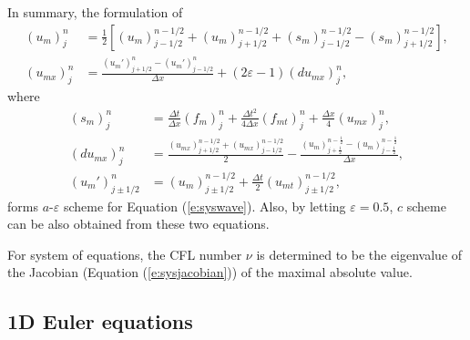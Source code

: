 \documentclass[11pt,dvips]{article}
\numberwithin{equation}{section}
\begin{document}
In summary, the formulation of
\begin{align}
  (u_m)_j^n &= \frac{1}{2}\left[
      (u_m)_{j-1/2}^{n-1/2} + (u_m)_{j+1/2}^{n-1/2}
    + (s_m)_{j-1/2}^{n-1/2} - (s_m)_{j+1/2}^{n-1/2}
    \right], \label{e:sysaeu} \\
  (u_{mx})_j^n &= \frac{(u_m')_{j+1/2}^n-(u_m')_{j-1/2}^n}{\Delta x}
    + (2\varepsilon-1)(du_{mx})_j^n, \label{e:sysaeux}
\end{align}
where
\begin{align*}
  (s_m)_j^n &=
      \frac{\Delta t}  {\Delta x} (f_m)_j^n
    + \frac{\Delta t^2}{4\Delta x}(f_{mt})_j^n
    + \frac{\Delta x}  {4}        (u_{mx})_j^n, \\
  (du_{mx})_j^n &=
      \frac{(u_{mx})_{j+1/2}^{n-1/2}
                  + (u_{mx})_{j-1/2}^{n-1/2}}{2}
    - \frac{(u_m)_{j+\frac{1}{2}}^{n-\frac{1}{2}}
          - (u_m)_{j-\frac{1}{2}}^{n-\frac{1}{2}}}
           {\Delta x}, \\
  (u_m')_{j\pm1/2}^n &=
      (u_m)_{j\pm1/2}^{n-1/2}
    + \frac{\Delta t}{2}(u_{mt})_{j\pm1/2}^{n-1/2},
\end{align*}
forms $a$-$\varepsilon$ scheme for Equation
(\ref{e:syswave})\cite{chang_method_1995}.  Also, by letting $\varepsilon=0.5$,
$c$ scheme can be also obtained from these two equations.

For system of equations, the CFL number $\nu$ is determined to be the
eigenvalue of the Jacobian (Equation (\ref{e:sysjacobian})) of the
maximal absolute value.

\subsection{1D Euler equations}
\end{document}
